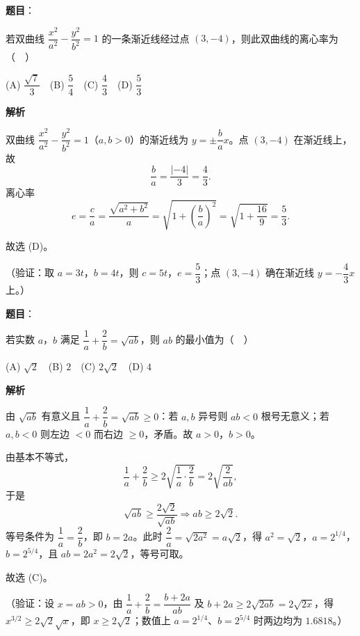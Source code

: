 \begin{answer}

\textbf{题目}：

若双曲线 \(\dfrac{x^2}{a^2}-\dfrac{y^2}{b^2}=1\) 的一条渐近线经过点 \((3,-4)\)，则此双曲线的离心率为（　）

(A) \(\dfrac{\sqrt7}{3}\)　(B) \(\dfrac54\)　(C) \(\dfrac43\)　(D) \(\dfrac53\)

\textbf{解析}

双曲线 \(\dfrac{x^2}{a^2}-\dfrac{y^2}{b^2}=1\)（\(a,b>0\)）的渐近线为 \(y=\pm\dfrac{b}{a}x\)。点 \((3,-4)\) 在渐近线上，故
\nopagebreak[4]
\[
\dfrac{b}{a}=\dfrac{|-4|}{3}=\dfrac43.
\]
离心率
\nopagebreak[4]
\[
e=\dfrac{c}{a}=\dfrac{\sqrt{a^2+b^2}}{a}
=\sqrt{1+\left(\dfrac ba\right)^2}
=\sqrt{1+\dfrac{16}{9}}=\dfrac53.
\]

故选 (D)。

（验证：取 \(a=3t\)，\(b=4t\)，则 \(c=5t\)，\(e=\dfrac53\)；点 \((3,-4)\) 确在渐近线 \(y=-\dfrac43x\) 上。）


\end{answer}
\begin{answer}

\textbf{题目}：

若实数 \(a\)，\(b\) 满足 \(\dfrac1a+\dfrac2b=\sqrt{ab}\)，则 \(ab\) 的最小值为（　）

(A) \(\sqrt2\)　(B) \(2\)　(C) \(2\sqrt2\)　(D) \(4\)

\textbf{解析}

由 \(\sqrt{ab}\) 有意义且 \(\dfrac1a+\dfrac2b=\sqrt{ab}\geqslant0\)：若 \(a,b\) 异号则 \(ab<0\) 根号无意义；若 \(a,b<0\) 则左边 \(<0\) 而右边 \(\geqslant0\)，矛盾。故 \(a>0\)，\(b>0\)。

由基本不等式，
\nopagebreak[4]
\[
\dfrac1a+\dfrac2b\geqslant2\sqrt{\dfrac{1}{a}\cdot\dfrac{2}{b}}
=2\sqrt{\dfrac{2}{ab}},
\]
于是
\nopagebreak[4]
\[
\sqrt{ab}\geqslant\dfrac{2\sqrt2}{\sqrt{ab}}
\Longrightarrow ab\geqslant2\sqrt2.
\]
等号条件为 \(\dfrac1a=\dfrac2b\)，即 \(b=2a\)。此时 \(\dfrac2a=\sqrt{2a^2}=a\sqrt2\)，得 \(a^2=\sqrt2\)，\(a=2^{1/4}\)，\(b=2^{5/4}\)，且 \(ab=2a^2=2\sqrt2\)，等号可取。

故选 (C)。

（验证：设 \(x=ab>0\)，由 \(\dfrac1a+\dfrac2b=\dfrac{b+2a}{ab}\) 及 \(b+2a\geqslant2\sqrt{2ab}=2\sqrt{2x}\)，得 \(x^{3/2}\geqslant2\sqrt2\sqrt x\)，即 \(x\geqslant2\sqrt2\)；数值上 \(a=2^{1/4}\)、\(b=2^{5/4}\) 时两边均为 \(1.6818\)。）


\end{answer}
